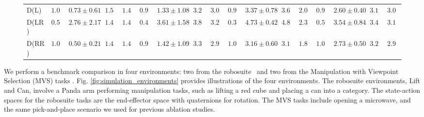 \begin{figure*}[htb]
\begin{minipage}{\textwidth}
\begin{tabular}{l|cccc|cccc|cccc|cccc}
        D(L) & $\mathbf{1.00}$ & $0.73 \pm 0.61$ & $1.50$ & $1.48$
                & $0.92$ & $1.33 \pm 1.08$ & $3.25$ & $3.07$ 
                & $0.92$ & $3.37 \pm 0.78$ & $3.60$ & $2.03$  
                & $0.98$ & $2.60 \pm 0.40$ & $\mathbf{3.14}$ & $3.01$\\  

        D(LR) & $0.54$ & $2.76 \pm 2.17$ & $1.47$ & $1.47$
                    & $0.44$ & $3.61 \pm 1.58$ & $3.80$ & $3.20$ 
                    & $0.34$ & $4.73 \pm 0.42$ & $4.85$ & $2.34$ 
                    & $0.58$ & $3.54 \pm 0.84$ & $3.49$ & $3.10$\\ 

        D(RR) & $\mathbf{1.00}$ & $\mathbf{0.50 \pm 0.21}$ & $\mathbf{1.46}$ & $\mathbf{1.41}$ 
                    & $0.92$ & $1.42 \pm 1.09$ & $3.34$ & $\mathbf{2.97}$
                    & $\mathbf{1.00}$ & $\mathbf{3.16 \pm 0.60}$ & $\mathbf{3.17}$ & $\mathbf{1.84}$  
                    & $\mathbf{1.00}$ & $2.73 \pm 0.50$ & $3.21$ & $\mathbf{2.91}$ \\  
        \hline
    \end{tabular}
\end{minipage}

\end{figure*}

We perform a benchmark comparison in four environments: two from the robosuite~\cite{zhu2020robosuite} and two from the Manipulation with Viewpoint Selection (MVS) tasks \cite{sun2024comparative}. Fig. \ref{fig:simulation_environments} provides illustrations of the four environments.
The robosuite environments, Lift and 
Can, involve a Panda arm performing manipulation tasks, such as lifting a red cube and placing a can into a category. The state-action spaces for the robosuite tasks are the end-effector space with quaternions for rotation. The MVS tasks include opening a microwave, and the same pick-and-place scenario we used for previous ablation studies.  


